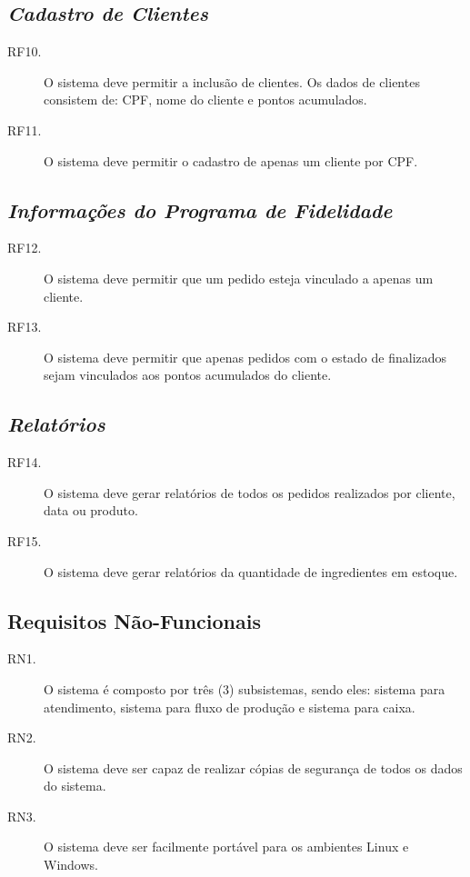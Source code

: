 \documentclass[article, 12pt, oneside, a4paper, brazil]{abntex2}
\begin{document}
 \subsection*{\emph{Cadastro de Clientes}}
 \begin{description}
  \item [RF10.] O sistema deve permitir a inclusão de clientes. Os dados de clientes consistem de: CPF, nome do cliente e pontos acumulados.
  \item [RF11.] O sistema deve permitir o cadastro de apenas um cliente por CPF.
 \end{description}
 
 \subsection*{\emph{Informações do Programa de Fidelidade}}
 \begin{description}
  \item [RF12.] O sistema deve permitir que um pedido esteja vinculado a apenas um cliente.
  \item [RF13.] O sistema deve permitir que apenas pedidos com o estado de finalizados sejam vinculados aos pontos acumulados do cliente.
 \end{description}
 
 \subsection*{\emph{Relatórios}}
 \begin{description}
  \item [RF14.] O sistema deve gerar relatórios de todos os pedidos realizados por cliente, data ou produto.
  \item [RF15.] O sistema deve gerar relatórios da quantidade de ingredientes em estoque.
 \end{description}
 
 \subsection{Requisitos Não-Funcionais}
 \begin{description}
  \item [RN1.] O sistema é composto por três (3) subsistemas, sendo eles: sistema para atendimento, sistema para fluxo de produção e sistema para caixa.
  \item [RN2.] O sistema deve ser capaz de realizar cópias de segurança de todos os dados do sistema.
  \item [RN3.] O sistema deve ser facilmente portável para os ambientes Linux e Windows.
 \end{description}


 
\end{document}
